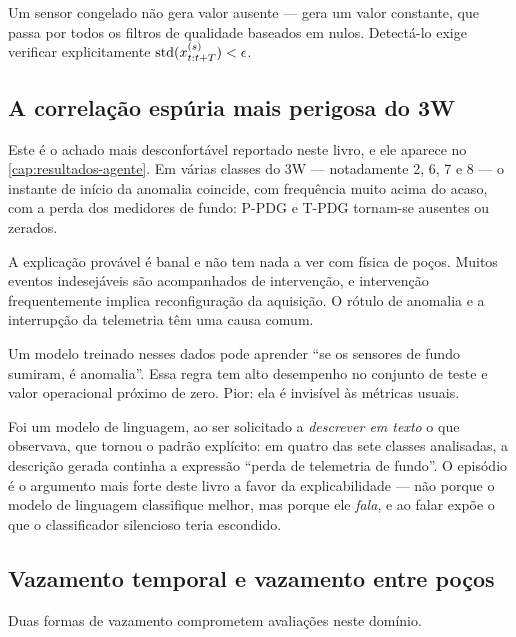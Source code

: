 Um sensor congelado não gera valor ausente --- gera um valor constante, que passa por
todos os filtros de qualidade baseados em nulos. Detectá-lo exige verificar
explicitamente $\operatorname{std}(x^{(s)}_{t:t+T}) < \epsilon$.

\subsection{A correlação espúria mais perigosa do 3W}
\label{sec:dados-telemetria}

Este é o achado mais desconfortável reportado neste livro, e ele aparece no
\cref{cap:resultados-agente}. Em várias classes do 3W --- notadamente 2, 6, 7 e 8 ---
o instante de início da anomalia coincide, com frequência muito acima do acaso, com a
perda dos medidores de fundo: P-PDG e T-PDG tornam-se ausentes ou zerados.

A explicação provável é banal e não tem nada a ver com física de poços. Muitos eventos
indesejáveis são acompanhados de intervenção, e intervenção frequentemente implica
reconfiguração da aquisição. O rótulo de anomalia e a interrupção da telemetria têm uma
causa comum.

\begin{destaque}
Um modelo treinado nesses dados pode aprender ``se os sensores de fundo sumiram, é
anomalia''. Essa regra tem alto desempenho no conjunto de teste e valor operacional
próximo de zero. Pior: ela é invisível às métricas usuais.

Foi um modelo de linguagem, ao ser solicitado a \emph{descrever em texto} o que
observava, que tornou o padrão explícito: em quatro das sete classes analisadas, a
descrição gerada continha a expressão ``perda de telemetria de fundo''. O episódio é o
argumento mais forte deste livro a favor da explicabilidade --- não porque o modelo de
linguagem classifique melhor, mas porque ele \emph{fala}, e ao falar expõe o que o
classificador silencioso teria escondido.
\end{destaque}

\subsection{Vazamento temporal e vazamento entre poços}

Duas formas de vazamento comprometem avaliações neste domínio.

